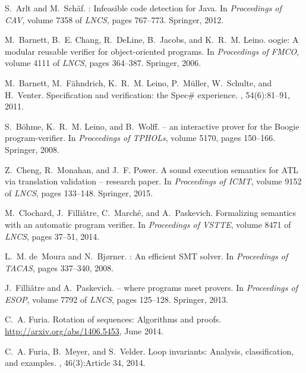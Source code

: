 \documentclass[a4paper,final]{llncs}
\begin{document}
\begin{thebibliography}{10}

S.~Arlt and M.~Sch{\"{a}}f.
: Infeasible code detection for {Java}.
\newblock In {\em Proceedings of CAV}, volume 7358 of {\em LNCS}, pages
  767--773. Springer, 2012.

M.~Barnett, B.~E. Chang, R.~DeLine, B.~Jacobs, and K.~R.~M. Leino.
oogie: {A} modular reusable verifier for object-oriented programs.
\newblock In {\em Proceedings of FMCO}, volume 4111 of {\em LNCS}, pages
  364--387. Springer, 2006.

M.~Barnett, M.~F{\"{a}}hndrich, K.~R.~M. Leino, P.~M{\"{u}}ller, W.~Schulte,
  and H.~Venter.
\newblock Specification and verification: the {S}pec{\#} experience.
, 54(6):81--91, 2011.

S.~B{\"{o}}hme, K.~R.~M. Leino, and B.~Wolff.
 -- an interactive prover for the {Boogie}
  program-verifier.
\newblock In {\em Proceedings of TPHOLs}, volume 5170, pages 150--166.
  Springer, 2008.

Z.~Cheng, R.~Monahan, and J.~F. Power.
\newblock A sound execution semantics for {ATL} via translation validation --
  research paper.
\newblock In {\em Proceedings of ICMT}, volume 9152 of {\em LNCS}, pages
  133--148. Springer, 2015.

M.~Clochard, J.~Filli{\^{a}}tre, C.~March{\'{e}}, and A.~Paskevich.
\newblock Formalizing semantics with an automatic program verifier.
\newblock In {\em Proceedings of VSTTE}, volume 8471 of {\em LNCS}, pages
  37--51, 2014.

L.~M. de~Moura and N.~Bj{\o}rner.
: An efficient {SMT} solver.
\newblock In {\em Proceedings of TACAS}, pages 337--340, 2008.

J.~Filli{\^{a}}tre and A.~Paskevich.
 -- where programs meet provers.
\newblock In {\em Proceedings of ESOP}, volume 7792 of {\em LNCS}, pages
  125--128. Springer, 2013.

C.~A. Furia.
\newblock Rotation of sequences: Algorithms and proofs.
\newblock \url{http://arxiv.org/abs/1406.5453}, June 2014.

C.~A. Furia, B.~Meyer, and S.~Velder.
\newblock Loop invariants: Analysis, classification, and examples.
, 46(3):Article 34, 2014.


\end{thebibliography}
\end{document}
